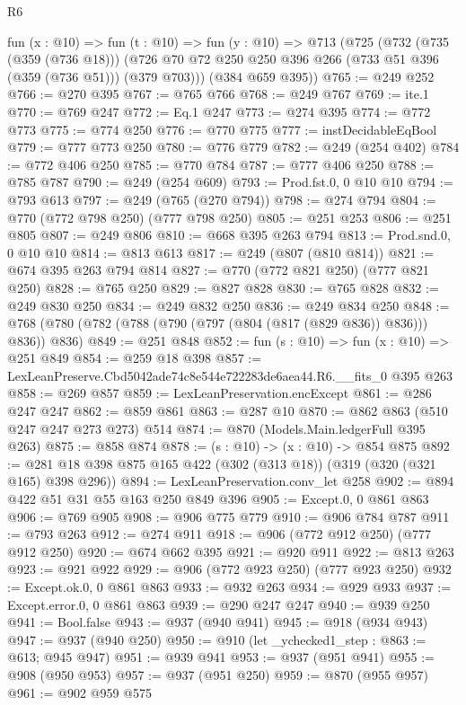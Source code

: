 \begin{lexlean}{R6}
\begin{coremodule}
  fun (x : @10) =>
  fun (t : @10) =>
  fun (y : @10) =>
  @713
    (@725
      (@732
        (@735 (@359 (@736 @18)))
        (@726 @70 @72 @250 @250 @396 @266 (@733 @51 @396 (@359 (@736 @51))) (@379 @703)))
      (@384 @659 @395))
@765 := @249 @252
@766 := @270 @395
@767 := @765 @766
@768 := @249 @767
@769 := ite.{1}
@770 := @769 @247
@772 := Eq.{1} @247
@773 := @274 @395
@774 := @772 @773
@775 := @774 @250
@776 := @770 @775
@777 := instDecidableEqBool
@779 := @777 @773 @250
@780 := @776 @779
@782 := @249 (@254 @402)
@784 := @772 @406 @250
@785 := @770 @784
@787 := @777 @406 @250
@788 := @785 @787
@790 := @249 (@254 @609)
@793 := Prod.fst.{0, 0} @10 @10
@794 := @793 @613
@797 := @249 (@765 (@270 @794))
@798 := @274 @794
@804 := @770 (@772 @798 @250) (@777 @798 @250)
@805 := @251 @253
@806 := @251 @805
@807 := @249 @806
@810 := @668 @395 @263 @794
@813 := Prod.snd.{0, 0} @10 @10
@814 := @813 @613
@817 := @249 (@807 (@810 @814))
@821 := @674 @395 @263 @794 @814
@827 := @770 (@772 @821 @250) (@777 @821 @250)
@828 := @765 @250
@829 := @827 @828
@830 := @765 @828
@832 := @249 @830 @250
@834 := @249 @832 @250
@836 := @249 @834 @250
@848 := @768 (@780 (@782 (@788 (@790 (@797 (@804 (@817 (@829 @836)) @836))) @836)) @836)
@849 := @251 @848
@852 := fun (s : @10) => fun (x : @10) => @251 @849
@854 := @259 @18 @398
@857 := LexLeanPreserve.Cbd5042ade74c8e544e722283de6aea44.R6.__fits_0 @395 @263
@858 := @269 @857
@859 := LexLeanPreservation.encExcept
@861 := @286 @247 @247
@862 := @859 @861
@863 := @287 @10
@870 := @862 @863 (@510 @247 @247 @273 @273) @514
@874 := @870 (Models.Main.ledgerFull @395 @263)
@875 := @858 @874
@878 := (s : @10) -> (x : @10) -> @854 @875
@892 := @281 @18 @398 @875 @165 @422 (@302 (@313 @18)) (@319 (@320 (@321 @165) @398 @296))
@894 := LexLeanPreservation.conv_let @258
@902 := @894 @422 @51 @31 @55 @163 @250 @849 @396
@905 := Except.{0, 0} @861 @863
@906 := @769 @905
@908 := @906 @775 @779
@910 := @906 @784 @787
@911 := @793 @263
@912 := @274 @911
@918 := @906 (@772 @912 @250) (@777 @912 @250)
@920 := @674 @662 @395
@921 := @920 @911
@922 := @813 @263
@923 := @921 @922
@929 := @906 (@772 @923 @250) (@777 @923 @250)
@932 := Except.ok.{0, 0} @861 @863
@933 := @932 @263
@934 := @929 @933
@937 := Except.error.{0, 0} @861 @863
@939 := @290 @247 @247
@940 := @939 @250
@941 := Bool.false
@943 := @937 (@940 @941)
@945 := @918 (@934 @943)
@947 := @937 (@940 @250)
@950 := @910 (let _ychecked1_step : @863 := @613; @945 @947)
@951 := @939 @941
@953 := @937 (@951 @941)
@955 := @908 (@950 @953)
@957 := @937 (@951 @250)
@959 := @870 (@955 @957)
@961 := @902 @959 @575

\end{coremodule}
\end{lexlean}
